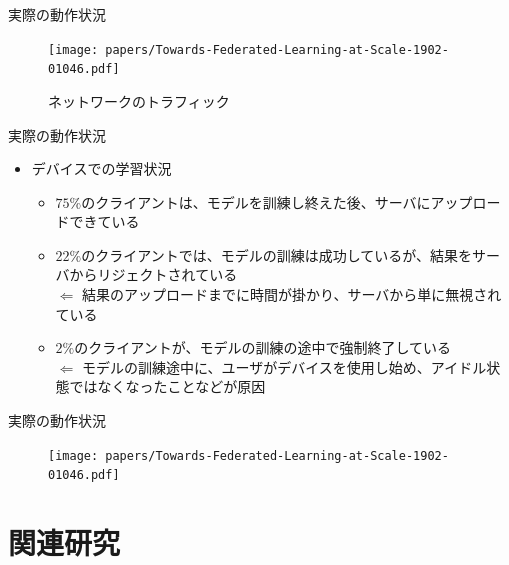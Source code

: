 \documentclass[dvipdfmx,notheorems,t]{beamer}
\begin{document}
\begin{frame}{実際の動作状況}

\begin{figure}
	\centering
	\texttt{[image: papers/Towards-Federated-Learning-at-Scale-1902-01046.pdf]}
	\caption{ネットワークのトラフィック~\cite{DBLP:journals/corr/abs-1902-01046}}
	\label{fig:server-network-traffic}
\end{figure}

\end{frame}

\begin{frame}{実際の動作状況}

\begin{itemize}
	\item デバイスでの学習状況
	\begin{itemize}
		\item $75\%$のクライアントは、モデルを訓練し終えた後、サーバにアップロードできている
		\newline
		
		\item $22\%$のクライアントでは、モデルの訓練は成功しているが、結果をサーバからリジェクトされている \\
		$\Leftarrow$ 結果のアップロードまでに時間が掛かり、サーバから単に無視されている
		\newline
		
		\item $2\%$のクライアントが、モデルの訓練の途中で強制終了している \\
		$\Leftarrow$ モデルの訓練途中に、ユーザがデバイスを使用し始め、アイドル状態ではなくなったことなどが原因
	\end{itemize}
\end{itemize}

\end{frame}

\begin{frame}{実際の動作状況}

\begin{figure}
	\centering
	\texttt{[image: papers/Towards-Federated-Learning-at-Scale-1902-01046.pdf]}
	\label{fig:on-device-training-round-sessions}
\end{figure}

\end{frame}

\section{関連研究}
\end{document}
